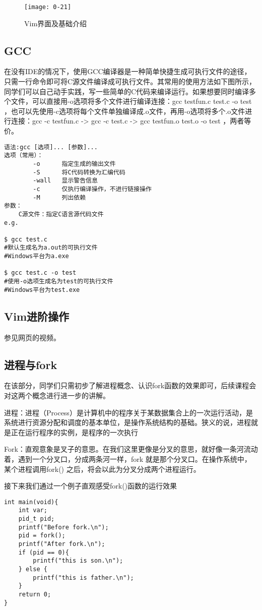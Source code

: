 \begin{figure}[htbp]
  \centering
  \texttt{[image: 0-21]}
  \caption{Vim界面及基础介绍}\label{fig:0-21}
\end{figure}

\subsection{GCC}
在没有IDE的情况下，使用GCC编译器是一种简单快捷生成可执行文件的途径，只需一行命令即可将C源文件编译成可执行文件。其常用的使用方法如下图所示，同学们可以自己动手实践，写一些简单的C代码来编译运行。如果想要同时编译多个文件，可以直接用-o选项将多个文件进行编译连接：gcc testfun.c test.c -o test ，也可以先使用-c选项将每个文件单独编译成.o文件，再用-o选项将多个.o文件进行连接：gcc -c testfun.c -> gcc -c test.c -> gcc testfun.o test.o -o test ，两者等价。

\begin{verbatim}
语法:gcc [选项]... [参数]...
选项（常用）：
		-o		指定生成的输出文件
		-S		将C代码转换为汇编代码
		-wall	显示警告信息
		-c		仅执行编译操作，不进行链接操作
		-M		列出依赖
参数：
	C源文件：指定C语言源代码文件
e.g.

$ gcc test.c
#默认生成名为a.out的可执行文件
#Windows平台为a.exe

$ gcc test.c -o test
#使用-o选项生成名为test的可执行文件
#Windows平台为test.exe
\end{verbatim}
\subsection{Vim进阶操作}
参见网页的视频。
\subsection{进程与fork}
在该部分，同学们只需初步了解进程概念、认识fork函数的效果即可，后续课程会对这两个概念进行进一步的讲解。

进程：进程（Process）是计算机中的程序关于某数据集合上的一次运行活动，是系统进行资源分配和调度的基本单位，是操作系统结构的基础。狭义的说，进程就是正在运行程序的实例，是程序的一次执行

Fork：直观意象是叉子的意思。在我们这里更像是分叉的意思，就好像一条河流动着，遇到一个分叉口，分成两条河一样，fork 就是那个分叉口。在操作系统中，某个进程调用fork() 之后，将会以此为分叉分成两个进程运行。

接下来我们通过一个例子直观感受fork()函数的运行效果

\begin{verbatim}
int main(void){
    int var;
    pid_t pid;
    printf("Before fork.\n");
    pid = fork();
    printf("After fork.\n");
    if (pid == 0){
        printf("this is son.\n");
    } else {
        printf("this is father.\n");
    }
    return 0;
}
\end{verbatim}

